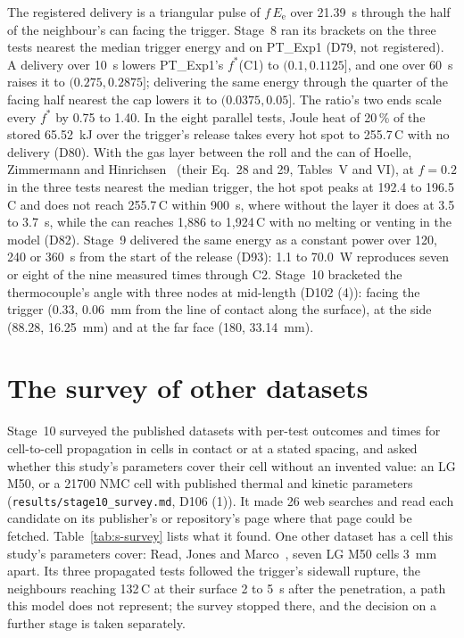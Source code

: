 \documentclass[preprint,12pt]{elsarticle}
\newcommand{\degC}{\,\textdegree C}
\newcommand{\fs}{f^{*}}
\newcommand{\Ee}{E_{\mathrm{e}}}
\begin{document}
The registered delivery is a triangular pulse of $f\,\Ee$ over 21.39~s through the half of the neighbour's can facing the trigger. Stage~8 ran its brackets on the three tests nearest the median trigger energy and on PT\_Exp1 (D79, not registered). A delivery over 10~s lowers PT\_Exp1's $\fs$(C1) to $(0.1, 0.1125]$, and one over 60~s raises it to $(0.275, 0.2875]$; delivering the same energy through the quarter of the facing half nearest the cap lowers it to $(0.0375, 0.05]$. The ratio's two ends scale every $\fs$ by 0.75 to 1.40. In the eight parallel tests, Joule heat of 20\,\% of the stored 65.52~kJ over the trigger's release takes every hot spot to 255.7\degC{} with no delivery (D80). With the gas layer between the roll and the can of Hoelle, Zimmermann and Hinrichsen~\cite{hoelle2023simulation} (their Eq.~28 and 29, Tables~V and VI), at $f=0.2$ in the three tests nearest the median trigger, the hot spot peaks at 192.4 to 196.5\degC{} and does not reach 255.7\degC{} within 900~s, where without the layer it does at 3.5 to 3.7~s, while the can reaches 1,886 to 1,924\degC{} with no melting or venting in the model (D82). Stage~9 delivered the same energy as a constant power over 120, 240 or 360~s from the start of the release (D93): 1.1 to 70.0~W reproduces seven or eight of the nine measured times through C2. Stage~10 bracketed the thermocouple's angle with three nodes at mid-length (D102 (4)): facing the trigger (0.33\textdegree, 0.06~mm from the line of contact along the surface), at the side (88.28\textdegree, 16.25~mm) and at the far face (180\textdegree, 33.14~mm).

\section{The survey of other datasets}
\label{sec:s-survey}

Stage~10 surveyed the published datasets with per-test outcomes and times for cell-to-cell propagation in cells in contact or at a stated spacing, and asked whether this study's parameters cover their cell without an invented value: an LG M50, or a 21700 NMC cell with published thermal and kinetic parameters (\texttt{results/stage10\_survey.md}, D106 (1)). It made 26 web searches and read each candidate on its publisher's or repository's page where that page could be fetched. Table~\ref{tab:s-survey} lists what it found. One other dataset has a cell this study's parameters cover: Read, Jones and Marco~\cite{read2024sidewall}, seven LG M50 cells 3~mm apart. Its three propagated tests followed the trigger's sidewall rupture, the neighbours reaching 132\degC{} at their surface 2 to 5~s after the penetration, a path this model does not represent; the survey stopped there, and the decision on a further stage is taken separately.
\end{document}
